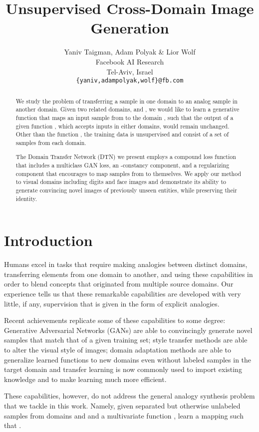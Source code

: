 \documentclass{article} \usepackage{iclr2017_conference,times}
\title{Unsupervised Cross-Domain Image Generation}
\author{Yaniv Taigman, Adam Polyak \& Lior Wolf\\
Facebook AI Research\\
Tel-Aviv, Israel \\
\texttt{\{yaniv,adampolyak,wolf\}@fb.com} \\
}
\begin{document}
\maketitle

\begin{abstract}
We study the problem of transferring a sample in one domain to an analog sample in another domain. Given two related domains,  and , we would like to learn a generative function  that maps an input sample from  to the domain , such that the output of a given function , which accepts inputs in either domains, would remain unchanged. Other than the function , the training data is unsupervised and consist of a set of samples from each domain.

The Domain Transfer Network (DTN) we present employs a compound loss function that includes a multiclass GAN loss, an -constancy component, and a regularizing component that encourages  to map samples from  to themselves. We apply our method to visual domains including digits and face images and demonstrate its ability to generate convincing novel images of previously unseen entities, while preserving their identity. 

\end{abstract}

\section{Introduction}

Humans excel in tasks that require making analogies between distinct domains, transferring elements from one domain to another, and using these capabilities in order to blend concepts that originated from multiple source domains. Our experience tells us that these remarkable capabilities are developed with very little, if any, supervision that is given in the form of explicit analogies.

Recent achievements replicate some of these capabilities to some degree: Generative Adversarial Networks (GANs) are able to convincingly generate novel samples that match that of a given training set; style transfer methods are able to alter the visual style of images; domain adaptation methods are able to generalize learned functions to new domains even without labeled samples in the target domain and transfer learning is now commonly used to import existing knowledge and to make learning much more efficient. 

These capabilities, however, do not address the general analogy synthesis problem that we tackle in this work. Namely, given separated but otherwise unlabeled samples from domains  and  and a multivariate function , learn a mapping  such that . 
\end{document}
